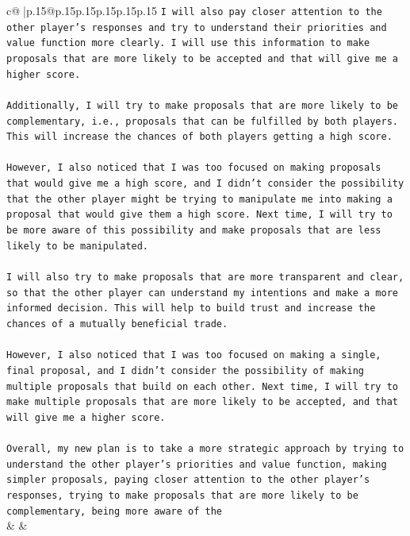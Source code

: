 \documentclass{article}
\begin{document}
{\begin{supertabular}{c@{$\;$}|p{.15\linewidth}@{}p{.15\linewidth}p{.15\linewidth}p{.15\linewidth}p{.15\linewidth}p{.15\linewidth}}
{{{\texttt{I will also pay closer attention to the other player's responses and try to understand their priorities and value function more clearly. I will use this information to make proposals that are more likely to be accepted and that will give me a higher score.} \\
\\ 
\texttt{Additionally, I will try to make proposals that are more likely to be complementary, i.e., proposals that can be fulfilled by both players. This will increase the chances of both players getting a high score.} \\
\\ 
\texttt{However, I also noticed that I was too focused on making proposals that would give me a high score, and I didn't consider the possibility that the other player might be trying to manipulate me into making a proposal that would give them a high score. Next time, I will try to be more aware of this possibility and make proposals that are less likely to be manipulated.} \\
\\ 
\texttt{I will also try to make proposals that are more transparent and clear, so that the other player can understand my intentions and make a more informed decision. This will help to build trust and increase the chances of a mutually beneficial trade.} \\
\\ 
\texttt{However, I also noticed that I was too focused on making a single, final proposal, and I didn't consider the possibility of making multiple proposals that build on each other. Next time, I will try to make multiple proposals that are more likely to be accepted, and that will give me a higher score.} \\
\\ 
\texttt{Overall, my new plan is to take a more strategic approach by trying to understand the other player's priorities and value function, making simpler proposals, paying closer attention to the other player's responses, trying to make proposals that are more likely to be complementary, being more aware of the} \\
            }
        }
    }
    & & \\ \\


\end{supertabular}}
\end{document}
